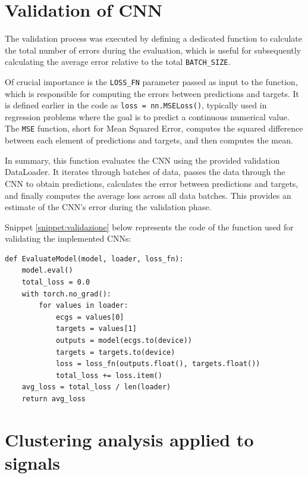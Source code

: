 \documentclass[12pt,italian]{report}
\begin{document}
\section{Validation of CNN}
\label{sec:validazione}

The validation process was executed by defining a dedicated function to calculate the total number of errors during the evaluation, which is useful for subsequently calculating the average error relative to the total \texttt{BATCH\_SIZE}.

Of crucial importance is the \texttt{LOSS\_FN} parameter passed as input to the function, which is responsible for computing the errors between predictions and targets. It is defined earlier in the code as \texttt{loss = nn.MSELoss()}, typically used in regression problems where the goal is to predict a continuous numerical value. The \texttt{MSE} function, short for Mean Squared Error, computes the squared difference between each element of predictions and targets, and then computes the mean.

In summary, this function evaluates the CNN using the provided validation DataLoader. It iterates through batches of data, passes the data through the CNN to obtain predictions, calculates the error between predictions and targets, and finally computes the average loss across all data batches. This provides an estimate of the CNN's error during the validation phase.

Snippet \ref{snippet:validazione} below represents the code of the function used for validating the implemented CNNs:

\lstset{language=Python}
\begin{lstlisting}[aboveskip=15pt, belowskip=15pt, basicstyle=\fontsize{8}{10}\selectfont, keywordstyle=\color{blue}, breaklines=true, label=snippet:validazione]
def EvaluateModel(model, loader, loss_fn):
    model.eval()
    total_loss = 0.0
    with torch.no_grad():
        for values in loader:
            ecgs = values[0]
            targets = values[1]
            outputs = model(ecgs.to(device))
            targets = targets.to(device)
            loss = loss_fn(outputs.float(), targets.float())
            total_loss += loss.item()
    avg_loss = total_loss / len(loader)
    return avg_loss
\end{lstlisting}

\section{Clustering analysis applied to signals}
\label{sec:clustering}
\end{document}

